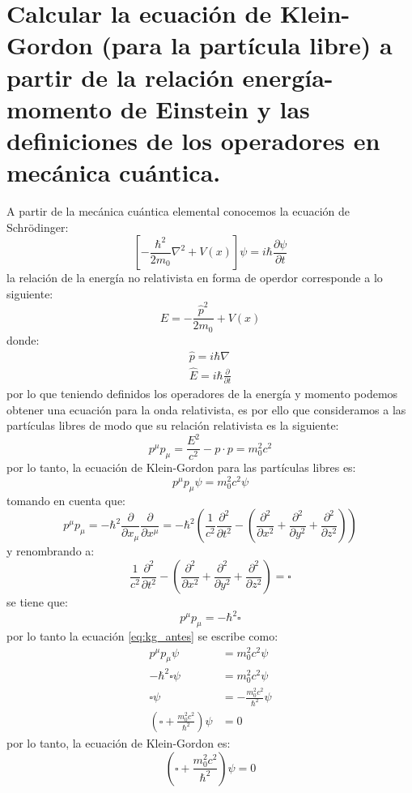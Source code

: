 \section{Calcular la ecuación de Klein-Gordon (para la partícula libre) a partir de la relación energía-
momento de Einstein y las definiciones de los operadores en mecánica cuántica.}
A partir de la mecánica cuántica elemental conocemos la ecuación de Schr\"odinger:
 \begin{equation}
     \left[-\frac{\hbar^2}{2m_0} \nabla^2+V(x) \right]\psi = i\hbar \frac{\partial \psi}{\partial t}
 \end{equation}
 la relación de la energía no relativista en forma de operdor corresponde a lo siguiente:
 \begin{equation}
     E= -\frac{\hat{p}^2}{2m_0}+V(x)
 \end{equation}
 donde: 
 \begin{align*}
     \hat{p}=i\hbar \nabla\\
     \hat{E}=i\hbar \frac{\partial}{\partial t}
 \end{align*}
 por lo que teniendo definidos los operadores de la energía y momento  podemos obtener una ecuación para la onda relativista, es por ello que 
 consideramos a las partículas libres de modo que su relación relativista es la siguiente:
 \begin{equation}
     p^\mu p_\mu = \frac{E^2}{c^2}- p\cdot p = m_0^2c^2
 \end{equation}
por lo tanto, la ecuación de Klein-Gordon para las partículas libres es:
\begin{equation}
    p^\mu p_\mu \psi = m_0^2c^2 \psi
    \label{eq:kg_antes}
\end{equation}
tomando en cuenta que:
\begin{equation}
    p^\mu p_\mu = -\hbar^2 \frac{\partial }{\partial x_\mu}\frac{\partial }{\partial x^\mu} = -\hbar^2 \left(\frac{1}{c^2}\frac{\partial^2 }{\partial t^2} - \left(\frac{\partial^2 }{\partial x^2}+\frac{\partial^2 }{\partial y^2}+\frac{\partial^2 }{\partial z^2} \right) \right)
\end{equation}
y renombrando a:
\begin{equation*}
    \frac{1}{c^2}\frac{\partial^2 }{\partial t^2} - \left(\frac{\partial^2 }{\partial x^2}+\frac{\partial^2 }{\partial y^2}+\frac{\partial^2 }{\partial z^2} \right) = \square
\end{equation*}
se tiene que:
\begin{equation*}
    p^\mu p_\mu = -\hbar^2 \square
\end{equation*}
por lo tanto la ecuación \ref{eq:kg_antes} se escribe como:
\begin{align*}
    p^\mu p_\mu \psi &= m_0^2c^2 \psi \\
    -\hbar^2 \square \psi &= m_0^2c^2  \psi\\
    \square \psi &=-\frac{m_0^2c^2}{\hbar^2} \psi\\
    \left(\square+ \frac{m_0^2c^2}{\hbar^2}\right)\psi &=0
\end{align*}
por lo tanto, la ecuación de Klein-Gordon es:
\begin{equation}
    \left(\square+ \frac{m_0^2c^2}{\hbar^2}\right)\psi=0
    \label{eq:KG}
\end{equation}